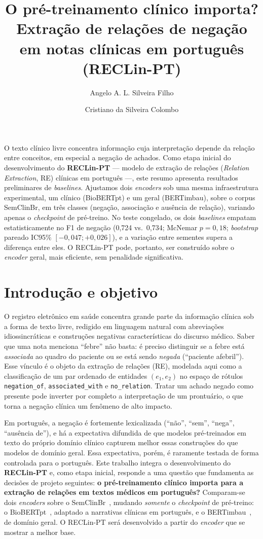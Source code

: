 \documentclass[12pt]{article}
\title{O pré-treinamento clínico importa? Extração de relações de negação
em notas clínicas em português (RECLin-PT)}
\author{Angelo A. L. Silveira Filho\inst{1} \and Cristiano da Silveira
Colombo\inst{1}}
\begin{document}
\maketitle

\begin{resumo}
O texto clínico livre concentra informação cuja interpretação depende da relação
entre conceitos, em especial a negação de achados. Como etapa inicial do
desenvolvimento do \textbf{RECLin-PT} --- modelo de extração de relações
(\emph{Relation Extraction}, RE) clínicas em português ---, este resumo apresenta
resultados preliminares de \emph{baselines}. Ajustamos dois \emph{encoders} sob
uma mesma infraestrutura experimental, um clínico (BioBERTpt) e um geral
(BERTimbau), sobre o corpus SemClinBr, em três classes (negação, associação e
ausência de relação), variando apenas o \emph{checkpoint} de pré-treino. No teste
congelado, os dois \emph{baselines} empatam estatisticamente no F1 de negação
(0,724 vs.\ 0,734; McNemar $p=0,18$; \emph{bootstrap} pareado IC95\%
$[-0,047;+0,026]$), e a variação entre sementes supera a diferença entre eles. O
RECLin-PT pode, portanto, ser construído sobre o \emph{encoder} geral, mais
eficiente, sem penalidade significativa.
\end{resumo}

\section{Introdução e objetivo}

O registro eletrônico em saúde concentra grande parte da informação clínica sob a
forma de texto livre, redigido em linguagem natural com abreviações
idiossincráticas e construções negativas características do discurso médico. Saber
que uma nota menciona ``febre'' não basta: é preciso distinguir se a febre está
\emph{associada} ao quadro do paciente ou se está sendo \emph{negada} (``paciente
afebril''). Esse vínculo é o objeto da extração de relações (RE), modelada aqui
como a classificação de um par ordenado de entidades $(e_1, e_2)$ no espaço de
rótulos \texttt{negation\_of}, \texttt{associated\_with} e \texttt{no\_relation}.
Tratar um achado negado como presente pode inverter por completo a interpretação
de um prontuário, o que torna a negação clínica um fenômeno de alto impacto.

Em português, a negação é fortemente lexicalizada (``não'', ``sem'', ``nega'',
``ausência de''), e há a expectativa difundida de que modelos pré-treinados em
texto do próprio domínio clínico capturem melhor essas construções do que modelos
de domínio geral. Essa expectativa, porém, é raramente testada de forma
controlada para o português. Este trabalho integra o desenvolvimento do
\textbf{RECLin-PT} e, como etapa inicial, responde a uma questão que fundamenta as
decisões de projeto seguintes: \textbf{o pré-treinamento clínico importa para a
extração de relações em textos médicos em português?} Comparam-se dois
\emph{encoders} sobre o SemClinBr~\cite{oliveira:22}, mudando \emph{somente} o
\emph{checkpoint} de pré-treino: o BioBERTpt~\cite{schneider:20}, adaptado a
narrativas clínicas em português, e o BERTimbau~\cite{souza:20}, de domínio geral.
O RECLin-PT será desenvolvido a partir do \emph{encoder} que se mostrar a melhor
base.
\end{document}
